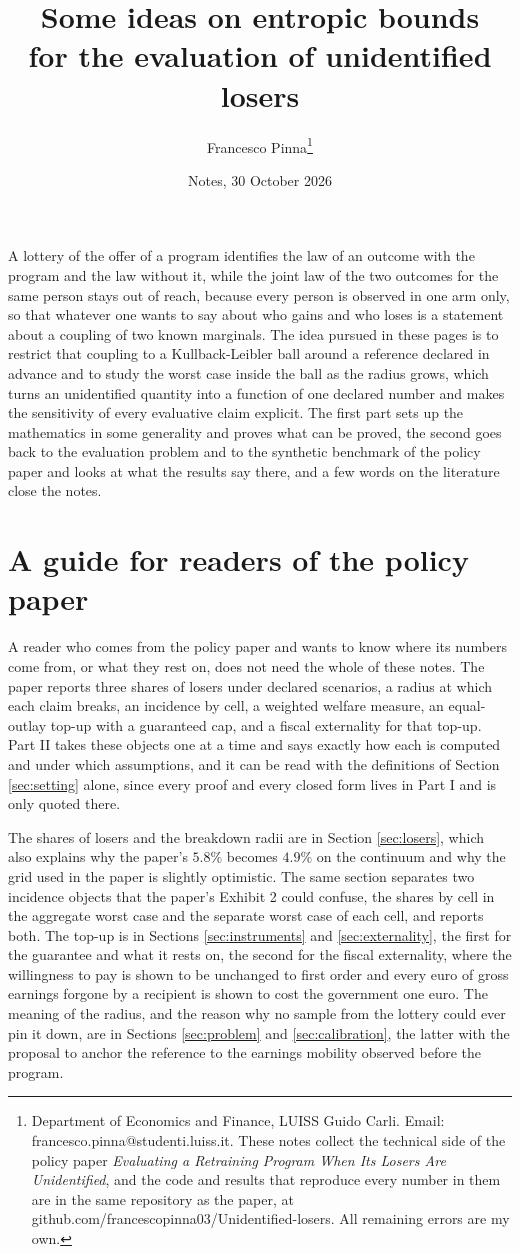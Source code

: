 \documentclass[11pt,a4paper]{article}
\title{Some ideas on entropic bounds\\for the evaluation of unidentified losers}
\author{Francesco Pinna\thanks{Department of Economics and Finance, LUISS Guido Carli. Email: francesco.pinna@studenti.luiss.it. These notes collect the technical side of the policy paper \emph{Evaluating a Retraining Program When Its Losers Are Unidentified}, and the code and results that reproduce every number in them are in the same repository as the paper, at github.com/francescopinna03/Unidentified-losers. All remaining errors are my own.}}
\date{Notes, 30 October 2026}
\theoremstyle{notesplain}
\theoremstyle{notesupright}
\numberwithin{equation}{section}
\begin{document}
\maketitle

\noindent A lottery of the offer of a program identifies the law of an outcome with the program and the law without it, while the joint law of the two outcomes for the same person stays out of reach, because every person is observed in one arm only, so that whatever one wants to say about who gains and who loses is a statement about a coupling of two known marginals. The idea pursued in these pages is to restrict that coupling to a Kullback-Leibler ball around a reference declared in advance and to study the worst case inside the ball as the radius grows, which turns an unidentified quantity into a function of one declared number and makes the sensitivity of every evaluative claim explicit. The first part sets up the mathematics in some generality and proves what can be proved, the second goes back to the evaluation problem and to the synthetic benchmark of the policy paper and looks at what the results say there, and a few words on the literature close the notes.

\section*{A guide for readers of the policy paper}
A reader who comes from the policy paper and wants to know where its numbers come from, or what they rest on, does not need the whole of these notes. The paper reports three shares of losers under declared scenarios, a radius at which each claim breaks, an incidence by cell, a weighted welfare measure, an equal-outlay top-up with a guaranteed cap, and a fiscal externality for that top-up. Part II takes these objects one at a time and says exactly how each is computed and under which assumptions, and it can be read with the definitions of Section \ref{sec:setting} alone, since every proof and every closed form lives in Part I and is only quoted there.

The shares of losers and the breakdown radii are in Section \ref{sec:losers}, which also explains why the paper's $5.8\%$ becomes $4.9\%$ on the continuum and why the grid used in the paper is slightly optimistic. The same section separates two incidence objects that the paper's Exhibit 2 could confuse, the shares by cell in the aggregate worst case and the separate worst case of each cell, and reports both. The top-up is in Sections \ref{sec:instruments} and \ref{sec:externality}, the first for the guarantee and what it rests on, the second for the fiscal externality, where the willingness to pay is shown to be unchanged to first order and every euro of gross earnings forgone by a recipient is shown to cost the government one euro. The meaning of the radius, and the reason why no sample from the lottery could ever pin it down, are in Sections \ref{sec:problem} and \ref{sec:calibration}, the latter with the proposal to anchor the reference to the earnings mobility observed before the program.
\end{document}
